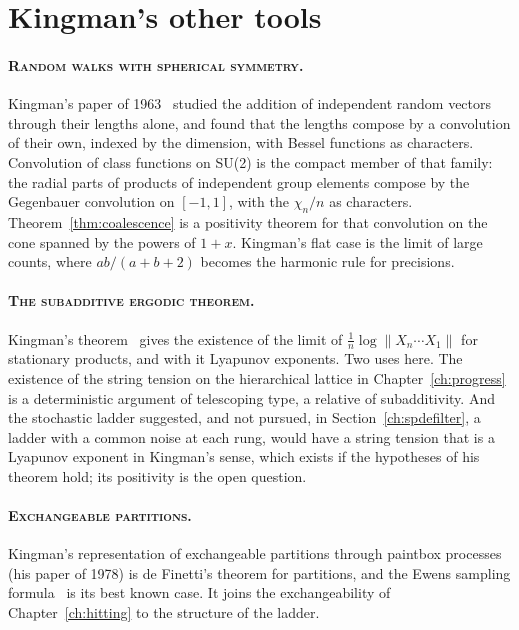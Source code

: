 \section{Kingman's other tools}

\paragraph{\normalfont\scshape Random walks with spherical symmetry.} Kingman's paper of 1963~\cite{Ki63} studied the addition of independent random vectors through their lengths alone, and found that the lengths compose by a convolution of their own, indexed by the dimension, with Bessel functions as characters. Convolution of class functions on SU(2) is the compact member of that family: the radial parts of products of independent group elements compose by the Gegenbauer convolution on $[-1,1]$, with the $\chi_n/n$ as characters. Theorem~\ref{thm:coalescence} is a positivity theorem for that convolution on the cone spanned by the powers of $1+x$. Kingman's flat case is the limit of large counts, where $ab/(a+b+2)$ becomes the harmonic rule for precisions.

\paragraph{\normalfont\scshape The subadditive ergodic theorem.} Kingman's theorem~\cite{Ki73} gives the existence of the limit of $\frac1n\log\|X_n\cdots X_1\|$ for stationary products, and with it Lyapunov exponents. Two uses here. The existence of the string tension on the hierarchical lattice in Chapter~\ref{ch:progress} is a deterministic argument of telescoping type, a relative of subadditivity. And the stochastic ladder suggested, and not pursued, in Section~\ref{ch:spdefilter}, a ladder with a common noise at each rung, would have a string tension that is a Lyapunov exponent in Kingman's sense, which exists if the hypotheses of his theorem hold; its positivity is the open question.

\paragraph{\normalfont\scshape Exchangeable partitions.} Kingman's representation of exchangeable partitions through paintbox processes (his paper of 1978) is de Finetti's theorem for partitions, and the Ewens sampling formula~\cite{Ew72} is its best known case. It joins the exchangeability of Chapter~\ref{ch:hitting} to the structure of the ladder.

